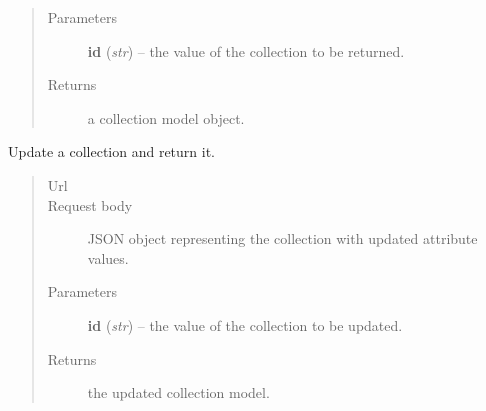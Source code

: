 \documentclass[letterpaper,10pt,english]{sphinxmanual}
\begin{document}
\begin{fulllineitems}
\begin{fulllineitems}
\begin{quote}
\begin{description}
\item[{Parameters}] \leavevmode
\textbf{id} (\emph{str}) -- the  value of the collection to be returned.

\item[{Returns}] \leavevmode
a collection model object.

\end{description}\end{quote}

\end{fulllineitems}


\begin{fulllineitems}
\label{api:onlinelinguisticdatabase.controllers.oldcollections.OldcollectionsController.update}
Update a collection and return it.
\begin{quote}\begin{description}
\item[{Url }] \leavevmode
{}

\item[{Request body}] \leavevmode
JSON object representing the collection with updated attribute values.

\item[{Parameters}] \leavevmode
\textbf{id} (\emph{str}) -- the  value of the collection to be updated.

\item[{Returns}] \leavevmode
the updated collection model.

\end{description}\end{quote}

\end{fulllineitems}


\end{fulllineitems}

\end{document}
